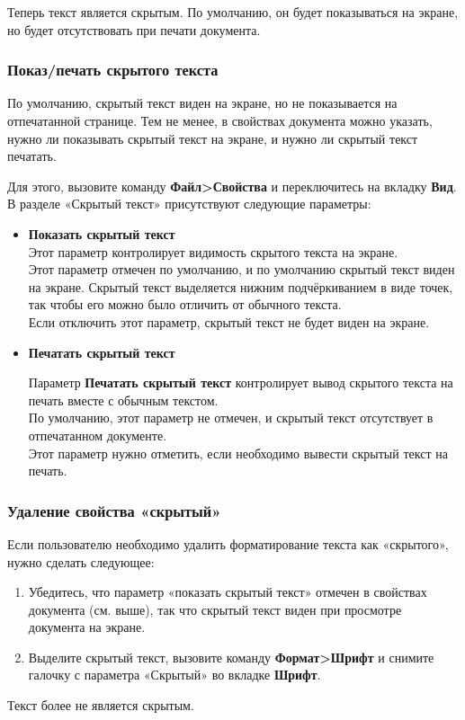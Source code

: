 \documentclass[a4paper,10pt]{article}
\begin{document}
Теперь текст является скрытым. По умолчанию, он будет показываться на экране, но будет отсутствовать при печати документа.

\subsubsection{Показ/печать скрытого текста}
По умолчанию, скрытый текст виден на экране, но не показывается на отпечатанной странице. Тем не менее, в свойствах документа можно указать, нужно ли показывать скрытый текст на экране, и нужно ли скрытый текст печатать.

Для этого, вызовите команду \textbf{Файл>Свойства} и переключитесь на вкладку \textbf{Вид}. В разделе «Скрытый текст» присутствуют следующие параметры:
\begin{itemize}
 \item \textbf{Показать скрытый текст}\\
Этот параметр контролирует видимость скрытого текста на экране.\\
Этот параметр отмечен по умолчанию, и по умолчанию скрытый текст виден на экране. Скрытый текст выделяется нижним подчёркиванием в виде точек, так чтобы его можно было отличить от обычного текста.\\
Если отключить этот параметр, скрытый текст не будет виден на экране.
\item \textbf{Печатать скрытый текст}

Параметр \textbf{Печатать скрытый текст} контролирует вывод скрытого текста на печать вместе с обычным текстом.\\
По умолчанию, этот параметр не отмечен, и скрытый текст отсутствует в отпечатанном документе.\\
Этот параметр нужно отметить, если необходимо вывести скрытый текст на печать.
\end{itemize}

\subsubsection{Удаление свойства «скрытый»}
Если пользователю необходимо удалить форматирование текста как «скрытого», нужно сделать следующее:
\begin{enumerate}
 \item Убедитесь, что параметр «показать скрытый текст» отмечен в свойствах документа (см. выше), так что скрытый текст виден при просмотре документа на экране.
 \item Выделите скрытый текст, вызовите команду \textbf{Формат>Шрифт} и снимите галочку с параметра «Скрытый» во вкладке \textbf{Шрифт}.
\end{enumerate}
Текст  более не является скрытым.
\end{document}
